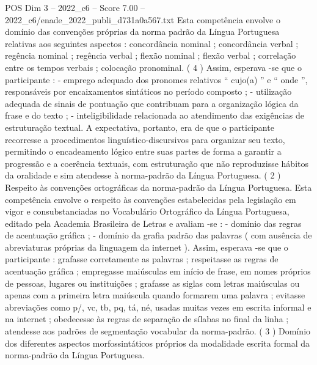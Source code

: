 \begin{textsample}{POS Dim 3 – 2022\_c6 – Score 7.00 – 2022\_c6/enade\_2022\_publi\_d731a0a567.txt}
Esta competência envolve o domínio das convenções próprias da norma padrão da Língua Portuguesa relativas aos seguintes aspectos : concordância nominal ; concordância verbal ; regência nominal ; regência verbal ; flexão nominal ; flexão verbal ; correlação entre os tempos verbais ; colocação pronominal. ( 4 ) Assim, esperava -se que o participante : - emprego adequado dos pronomes relativos “ cujo(a) ” e “ onde ”, responsáveis por encaixamentos sintáticos no período composto ; - utilização adequada de sinais de pontuação que contribuam para a organização lógica da frase e do texto ; - inteligibilidade relacionada ao atendimento das exigências de estruturação textual.
A expectativa, portanto, era de que o participante recorresse a procedimentos linguístico-discursivos para organizar seu texto, permitindo o encadeamento lógico entre suas partes de forma a garantir a progressão e a coerência textuais, com estruturação que não reproduzisse hábitos da oralidade e sim atendesse à norma-padrão da Língua Portuguesa. ( 2 ) Respeito às convenções ortográficas da norma-padrão da Língua Portuguesa.
Esta competência envolve o respeito às convenções estabelecidas pela legislação em vigor e consubstanciadas no Vocabulário Ortográfico da Língua Portuguesa, editado pela Academia Brasileira de Letras e avaliam -se : - domínio das regras de acentuação gráfica ; - domínio da grafia padrão das palavras ( com ausência de abreviaturas próprias da linguagem da internet ).
Assim, esperava -se que o participante : grafasse corretamente as palavras ; respeitasse as regras de acentuação gráfica ; empregasse maiúsculas em início de frase, em nomes próprios de pessoas, lugares ou instituições ; grafasse as siglas com letras maiúsculas ou apenas com a primeira letra maiúscula quando formarem uma palavra ; evitasse abreviações como p/, vc, tb, pq, tá, né, usadas muitas vezes em escrita informal e na internet ; obedecesse às regras de separação de sílabas no final da linha ; atendesse aos padrões de segmentação vocabular da norma-padrão. ( 3 ) Domínio dos diferentes aspectos morfossintáticos próprios da modalidade escrita formal da norma-padrão da Língua Portuguesa.

\end{textsample}
